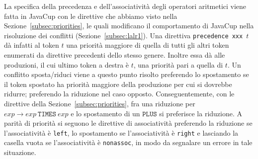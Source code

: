 La specifica della precedenza e dell'associativit\`a degli operatori
aritmetici viene fatta in JavaCup con le direttive che abbiamo visto nella
Sezione~\ref{subsec:priorities}, le quali modificano il comportamento
di JavaCup nella risoluzione dei conflitti (Sezione~\ref{subsec:lalr1}).
Una direttiva \texttt{precedence xxx $t$} d\`a infatti al token $t$ una
priorit\`a maggiore di quella di tutti gli altri token enumerati da
direttive precedenti dello stesso genere. Inoltre essa d\`a alle produzioni, il cui ultimo
token a destra \`e $t$, una priorit\`a pari a quella di $t$. Un conflitto
sposta/riduci viene a questo punto risolto preferendo lo spostamento se il
token spostato ha priorit\`a maggiore della produzione per cui si dovrebbe
ridurre; preferendo la riduzione nel caso opposto. Conseguentemente, con le direttive
della Sezione~\ref{subsec:priorities}, fra una riduzione per
$\mathit{exp}\to\mathit{exp}\ \mathtt{TIMES}\ \mathit{exp}$ e lo spostamento
di un $\mathtt{PLUS}$ si preferisce la riduzione. A parit\`a di
priorit\`a si seguono le direttive di associativit\`a preferendo la
riduzione se l'associativit\`a \`e \texttt{left}, lo spostamento
se l'associativit\`a \`e \texttt{right} e lasciando la casella vuota
se l'associativit\`a \`e \texttt{nonassoc}, in modo da segnalare un errore
in tale situazione.

